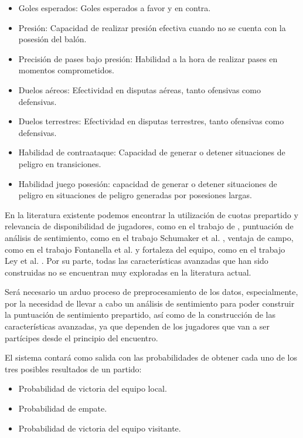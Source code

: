 \begin{enumerate}
    \begin{itemize}
        \item Goles esperados: Goles esperados a favor y en contra.
        \item Presión: Capacidad de realizar presión efectiva cuando no se cuenta con la posesión del balón.
        \item Precisión de pases bajo presión: Habilidad a la hora de realizar pases en momentos comprometidos.
        \item Duelos aéreos: Efectividad en disputas aéreas, tanto ofensivas como defensivas.
        \item Duelos terrestres: Efectividad en disputas terrestres, tanto ofensivas como defensivas.
        \item Habilidad de contraataque: Capacidad de generar o detener situaciones de peligro en transiciones.
         \item Habilidad juego posesión: capacidad de generar o detener situaciones de peligro en situaciones de peligro generadas por posesiones largas.
    \end{itemize}
\end{enumerate}

En la literatura existente podemos encontrar la utilización de cuotas prepartido y relevancia de disponibilidad de jugadores, como en el trabajo de \cite{Fisher2024PricingResponse}, puntuación de análisis de sentimiento, como en el trabajo Schumaker et al. \cite{Schumaker2016}, ventaja de campo, como en el trabajo Fontanella et al. \cite{Fontanella2020Visual} y fortaleza del equipo, como en el trabajo Ley et al. \cite{leyRankingSoccerTeams2019}. Por su parte, todas las características avanzadas que han sido construidas no se encuentran muy exploradas en la literatura actual.

Será necesario un arduo proceso de preprocesamiento de los datos, especialmente, por la necesidad de llevar a cabo un análisis de sentimiento para poder construir la puntuación de sentimiento prepartido, así como de la construcción de las características avanzadas, ya que dependen de los jugadores que van a ser partícipes desde el principio del encuentro.

El sistema contará como salida con las probabilidades de obtener cada uno de los tres posibles resultados de un partido:
\begin{itemize}
    \item Probabilidad de victoria del equipo local.
    \item Probabilidad de empate.
    \item Probabilidad de victoria del equipo visitante.
\end{itemize}

